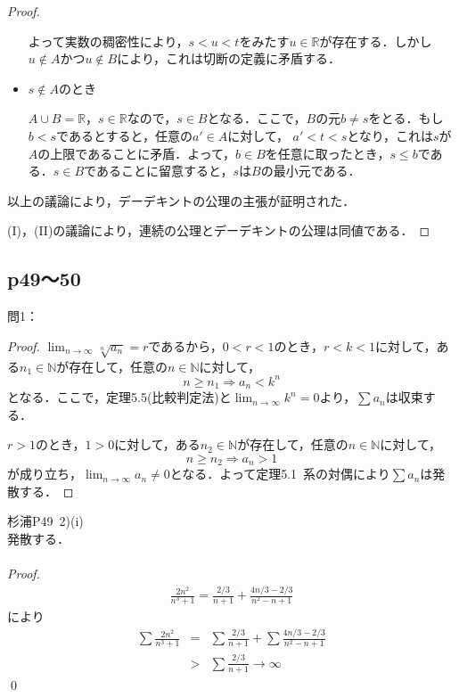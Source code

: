 \documentclass[dvipdfmx,uplatex,11pt]{jsarticle}
\theoremstyle{definition}
\begin{document}
\begin{leftbar}
\begin{proof}
\begin{itemize}
            よって実数の稠密性により，$s < u < t$をみたす$ u \in \mathbb{R}$が存在する．しかし$u \notin A$かつ$u \notin B$により，これは切断の定義に矛盾する．\\
            \item $ s \notin A$のとき\par
            $ A \cup B = \mathbb{R}$，$ s \in \mathbb{R}$なので，$ s \in B$となる．ここで，$B$の元$b \ne s$をとる．もし$ b <s$であるとすると，任意の$ a' \in A$に対して，
            $ a' < t <s$となり，これは$s$が$A$の上限であることに矛盾．よって，$b \in B$を任意に取ったとき，$s \le b$である．$s \in B$であることに留意すると，$s$は$B$の最小元である．
        \end{itemize}
        以上の議論により，デーデキントの公理の主張が証明された．\par 
        (I)，(II)の議論により，連続の公理とデーデキントの公理は同値である．
    \end{proof}
    \end{leftbar}
\newpage
\subsection{p49～50}
問1：
\begin{leftbar}
	\begin{proof}
		$\lim_{n \to \infty} \sqrt[n]{a_n} =r$であるから，$0<r<1$のとき，$r<k<1$に対して，ある$n_1 \in \mathbb{N}$が存在して，任意の$n \in \mathbb{N}$に対して，
		\[
			n \ge n_1 \Longrightarrow a_n<k^n
		\]
		となる．ここで，定理5.5(比較判定法)と$\lim_{n \to \infty} k^n =0$より，$\sum a_n$は収束する．\par 
		$r>1$のとき，$1>0$に対して，ある$n_2 \in \mathbb{N}$が存在して，任意の$n \in \mathbb{N}$に対して，
		\[
			n \ge n_2 \Longrightarrow a_n >1
		\]
		が成り立ち，$\lim_{n \to \infty} a_n \ne 0$となる．よって定理5.1~系の対偶により$\sum a_n$は発散する．
	\end{proof}
\end{leftbar}

\newpage

\begin{screen}
	杉浦P49~2)(i)\\
	発散する．\\
	\dotfill \\
	{\it Proof.}
	\begin{eqnarray*}
	\frac{2n^2}{n^3+1}=\frac{2/3}{n+1}+\frac{4n/3-2/3}{n^2-n+1}
	\end{eqnarray*}
	により
	\begin{eqnarray*}
	\sum \frac{2n^2}{n^3+1}&=&\sum \frac{2/3}{n+1}+\sum \frac{4n/3-2/3}{n^2-n+1} \\
	&>&\sum \frac{2/3}{n+1} \rightarrow \infty
	\end{eqnarray*}
	\qed
	\end{screen}
	
\end{document}
